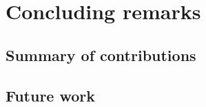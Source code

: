 \chapter{Concluding remarks}
\label{chap:conclusions}

\section{Summary of contributions}

\section{Future work}